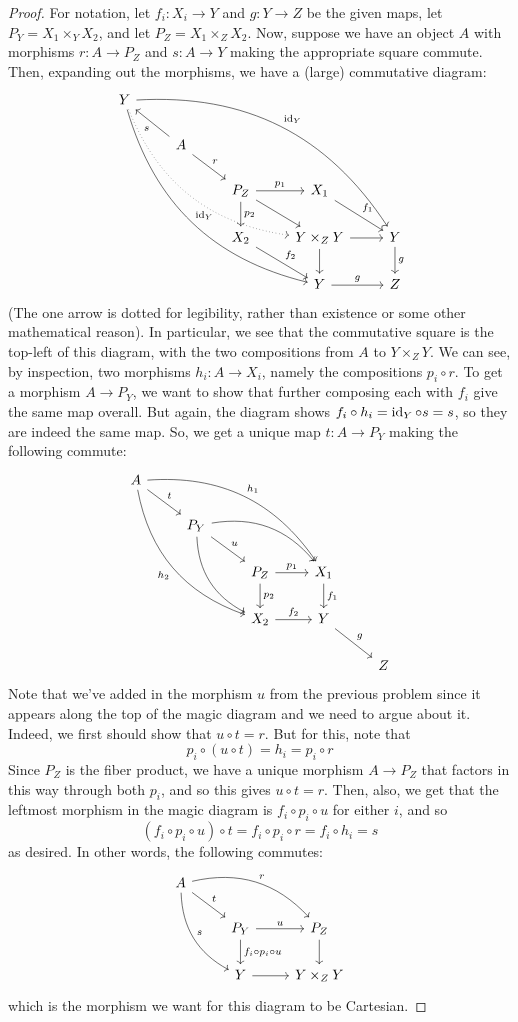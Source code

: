 \documentclass[12pt]{exam}
\begin{document}
\begin{proof}
	For notation, let $f_i : X_i \to Y$ and $g : Y \to Z$ be the given maps, let $P_Y = X_1 \times_Y X_2$, and let $P_Z = X_1 \times_Z X_2$. Now, suppose we have an object $A$ with morphisms $r : A \to P_Z$ and $s : A \to Y$ making the appropriate square commute. Then, expanding out the morphisms, we have a (large) commutative diagram:
	\[ \begin{tikzcd} Y \arrow[bend right]{ddddrrr}{\id_Y} \arrow[bend left]{dddrrrr}{\id_Y} \arrow[bend right, dotted]{dddrrr}{} \\ & A \arrow{ul}{s} \arrow{dr}{r} \\ & & P_Z \arrow{r}{p_1} \arrow{d}{p_2} \arrow{dr}{} & X_1 \arrow{dr}{f_1} \\ & & X_2 \arrow{dr}{f_2} & Y \times_Z Y \arrow{r}{} \arrow{d}{} & Y \arrow{d}{g} \\ & & & Y \arrow{r}{g} & Z \end{tikzcd} \]
	(The one arrow is dotted for legibility, rather than existence or some other mathematical reason). In particular, we see that the commutative square is the top-left of this diagram, with the two compositions from $A$ to $Y \times_Z Y$. We can see, by inspection, two morphisms $h_i : A \to X_i$, namely the compositions $p_i \circ r$. To get a morphism $A \to P_Y$, we want to show that further composing each with $f_i$ give the same map overall. But again, the diagram shows $f_i \circ h_i = \operatorname{id}_Y \circ s = s$, so they are indeed the same map. So, we get a unique map $t : A \to P_Y$ making the following commute:
	\[ \begin{tikzcd} A \arrow[bend left]{ddrrr}{h_1} \arrow{dr}{t} \arrow[bend right,swap]{dddrr}{h_2} \\ & P_Y \arrow[bend left]{drr}{} \arrow[bend right]{ddr}{} \arrow{dr}{u} \\ & & P_Z \arrow{d}{p_2} \arrow{r}{p_1} & X_1 \arrow{d}{f_1} \\ & & X_2 \arrow{r}{f_2} & Y \arrow{dr}{g} \\ & & & & Z \end{tikzcd} \]
	Note that we've added in the morphism $u$ from the previous problem since it appears along the top of the magic diagram and we need to argue about it. Indeed, we first should show that $u \circ t = r$. But for this, note that
	\[ p_i \circ (u \circ t) = h_i = p_i \circ r \]
	Since $P_Z$ is the fiber product, we have a unique morphism $A \to P_Z$ that factors in this way through both $p_i$, and so this gives $u \circ t = r$. Then, also, we get that the leftmost morphism in the magic diagram is $f_i \circ p_i \circ u$ for either $i$, and so
	\[ (f_i \circ p_i \circ u) \circ t = f_i \circ p_i \circ r = f_i \circ h_i = s\]
	as desired. In other words, the following commutes:
	\[ \begin{tikzcd} A \arrow[bend left]{drr}{r} \arrow[bend right]{ddr}{s} \arrow{dr}{t} \\ & P_Y \arrow{r}{u} \arrow{d}{f_i \circ p_i \circ u} & P_Z \arrow{d}{} \\ & Y \arrow{r}{} & Y \times_Z Y \end{tikzcd} \]
	which is the morphism we want for this diagram to be Cartesian.
	

\end{proof}
\end{document}
